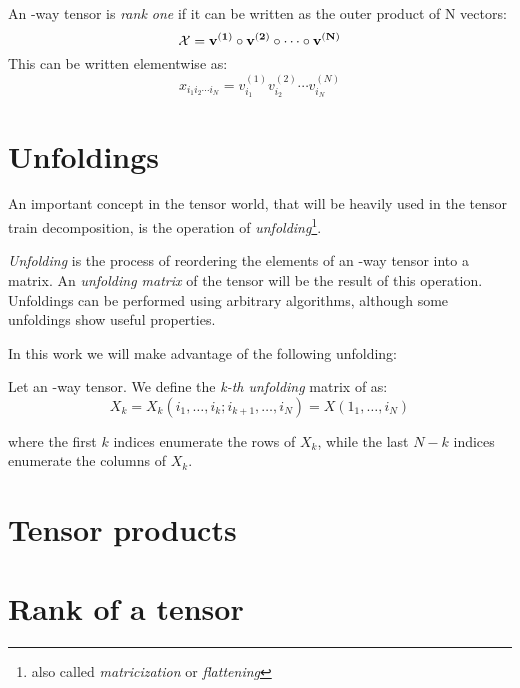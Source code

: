 \begin{Def}
  An \N-way tensor \X is \emph{rank one} if it can be written as the outer product of N vectors:
  \[
  \mathcal{X} = \mathbf{v^{(1)}} \circ \mathbf{v^{(2)}} \circ \cdots \circ \mathbf{v^{(N)}}
  \]
  This can be written elementwise as:
  \[
  x_{i_1 i_2 \cdots i_N} = v_{i_1}^{(1)} v_{i_2}^{(2)} \cdots v_{i_N}^{(N)}
  \]
\end{Def}

\section{Unfoldings}
An important concept in the tensor world, that will be heavily used in the tensor train decomposition, is the operation of \emph{unfolding}\footnote{also called \emph{matricization} or \emph{flattening}}.

\emph{Unfolding} is the process of reordering the elements of an \N-way tensor into a matrix. An \emph{unfolding matrix} of the tensor will be the result of this operation. Unfoldings can be performed using arbitrary algorithms, although some unfoldings show useful properties.

In this work we will make advantage of the following unfolding:

\begin{Def}
  Let \X an \N-way tensor. We define the \emph{k-th unfolding} matrix of \X as:
  \begin{equation} \label{def:unfolding}
    X_k = X_k(i_1,\dots,i_k;i_{k+1},\dots,i_N) = X(1_1,\dots,i_N)
  \end{equation}

where the first $k$ indices enumerate the rows of $X_k$, while the last $N - k$ indices enumerate the columns of $X_k$.
\end{Def}

\section{Tensor products}


\section{Rank of a tensor}
